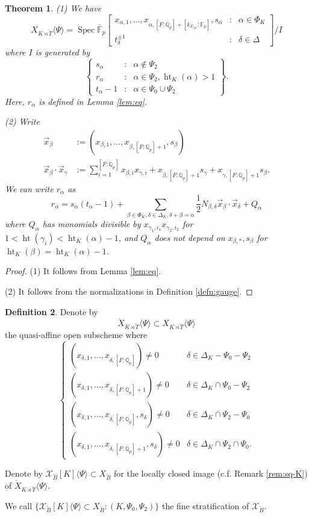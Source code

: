 \documentclass[11pt]{amsart}
\newcommand{\MINOREDITED}[1]{#1}
\newtheorem{thm}{Theorem}[section]
\theoremstyle{definition}
\newtheorem{defn}[thm]{Definition}
\newcommand{\Q}{\mathbb{Q}}
\newcommand{\F}{\mathbb{F}}
\newcommand{\bFp}{\bar{\mathbb{F}}_p}
\newcommand{\cX}{\mathcal{X}}
\newcommand{\bB}{\breve{B}}
\newcommand{\bT}{\breve{T}}
\newcommand{\cyc}{{\operatorname{cyc}}}
\newcommand{\dkF}{[k_{F_{\cyc}}:\F_p]}
\newcommand{\dF}{[F:\Q_p]}
\DeclareMathOperator{\Ht}{ht}
\DeclareMathOperator{\Spec}{Spec}
\begin{document}
\begin{thm}
\rm
\label{thm:eq}
(1) 
We have
\[
X_{K\rtimes \bT}\langle\Psi\rangle
=\Spec \bFp
\left[
\begin{matrix}
x_{\alpha,1},\dots,x_{\alpha,\dF+\dkF},
s_\alpha&:&\alpha\in \Phi_K
\\
t_\delta^{\pm 1}&:&
\delta\in \Delta
\end{matrix}
\right]/
I
\]
where $I$ is generated by
\[
\left\{
\begin{matrix}
s_\alpha &:& \alpha \not\in \Psi_2 \\
r_\alpha &:& \alpha \in \Psi_2, \Ht_K(\alpha)>1 \\
t_\alpha-1 &:& \alpha\in \Psi_0\cup\Psi_2
\end{matrix}
\right\}.
\]
Here, $r_\alpha$ is defined in Lemma \ref{lem:eq}.

(2)
Write
\begin{align*}
\vec x_\beta&:=(x_{\beta,1},\dots, x_{\beta,[F:\Q_p]+1}, s_\beta)
\\
\vec x_\beta\cdot \vec x_\gamma&:=
\sum_{i=1}^{[F:\Q_p]}
x_{\beta,i}x_{\gamma,i}
+x_{\beta,[F:\Q_p]+1}s_\gamma
+x_{\gamma,[F:\Q_p]+1}s_\beta.
\end{align*}
We can write $r_\alpha$
as
\[
r_\alpha=s_\alpha(t_\alpha-1)+
\sum_{\beta\in \Phi_K,
\delta\in \Delta_K, \delta+\beta=\alpha}
\frac{1}{2} 
N_{\beta, \delta}\vec x_\beta\cdot \vec x_\delta
+Q_\alpha
\]
where $Q_\alpha$
has monomials \MINOREDITED{divisible by}
$x_{\gamma_1,i_1}x_{\gamma_2,i_2}$
for $1<\Ht(\gamma_i)<\Ht_K(\alpha)-1$,
and $Q_\alpha$
does not depend on
$x_{\beta,*}, s_\beta$
for $\Ht_K(\beta)=\Ht_K(\alpha)-1$.
\end{thm}

\begin{proof}
(1) It follows from Lemma \ref{lem:eq}.

(2) It follows from the normalizations in Definition
\ref{defn:gauge}.
\end{proof}

\begin{defn}
Denote by
\[
\dot X_{K\rtimes \bT}\langle\Psi\rangle
\subset
X_{K\rtimes \bT}\langle\Psi\rangle
\]
the quasi-affine open subscheme
where
\[
\begin{cases}
(x_{\delta, 1}, \dots, x_{\delta,[F:\Q_p]})\neq 0
& \delta\in \Delta_K-\Psi_0-\Psi_2\\
(x_{\delta, 1}, \dots, x_{\delta,[F:\Q_p]+1})\neq 0
& \delta\in \Delta_K\cap\Psi_0-\Psi_2\\
(x_{\delta, 1}, \dots, x_{\delta,[F:\Q_p]}, s_\delta)\neq 0
& \delta\in \Delta_K\cap\Psi_2-\Psi_0\\
(x_{\delta, 1}, \dots, x_{\delta,[F:\Q_p]+1}, s_\delta)\neq 0
& \delta\in \Delta_K\cap\Psi_2\cap\Psi_0.
\end{cases}
\]

Denote by
$\cX_{\bB}[K]\langle\Psi\rangle\subset X_{\bB}$
for the locally closed image (c.f. Remark \ref{rem:sq-K}) of
$\dot X_{K\rtimes \bT}\langle\Psi\rangle$.

We call $\{\cX_{\bB}[K]\langle\Psi\rangle\subset X_{\bB}:
(K,\Psi_0,\Psi_2)\}$
the fine stratification of $\cX_{\bB}$.
\end{defn}
\end{document}

